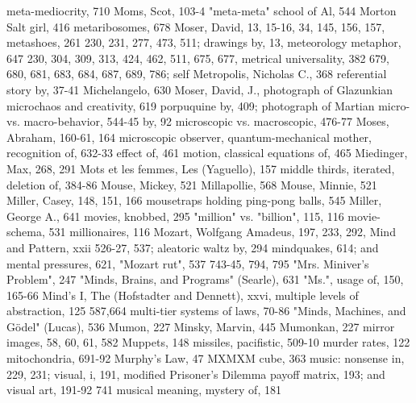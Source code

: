 meta-mediocrity, 710                            Moms, Scot, 103-4
"meta-meta" school of Al, 544                   Morton Salt girl, 416
metaribosomes, 678                              Moser, David, 13, 15-16, 34, 145, 156, 157,
metashoes, 261                                   230, 231, 277, 473, 511; drawings by, 13,
meteorology metaphor, 647                        230, 304, 309, 313, 424, 462, 511, 675, 677,
metrical universality, 382                      679, 680, 681, 683, 684, 687, 689, 786; self
Metropolis, Nicholas C., 368                     referential story by, 37-41
Michelangelo, 630                               Moser, David, J., photograph of Glazunkian
microchaos and creativity, 619                   porpuquine by, 409; photograph of Martian
 micro- vs. macro-behavior, 544-45               by, 92
 microscopic vs. macroscopic, 476-77            Moses, Abraham, 160-61, 164
microscopic observer, quantum-mechanical        mother, recognition of, 632-33
 effect of, 461                                 motion, classical equations of, 465
Miedinger, Max, 268, 291                        Mots et les femmes, Les (Yaguello), 157
middle thirds, iterated, deletion of, 384-86    Mouse, Mickey, 521
Millapollie, 568                                Mouse, Minnie, 521
Miller, Casey, 148, 151, 166                    mousetraps holding ping-pong balls, 545
Miller, George A., 641                          movies, knobbed, 295
"million" vs. "billion", 115, 116               movie-schema, 531
millionaires, 116                               Mozart, Wolfgang Amadeus, 197, 233, 292,
Mind and Pattern, xxii                           526-27, 537; aleatoric waltz by, 294
mindquakes, 614; and mental pressures, 621,     "Mozart rut", 537
 743-45, 794, 795                               "Mrs. Miniver's Problem", 247
"Minds, Brains, and Programs" (Searle), 631     "Ms.", usage of, 150, 165-66
Mind's I, The (Hofstadter and Dennett), xxvi,   multiple levels of abstraction, 125
 587,664                                        multi-tier systems of laws, 70-86
"Minds, Machines, and Gödel" (Lucas), 536       Mumon, 227
Minsky, Marvin, 445                             Mumonkan, 227
mirror images, 58, 60, 61, 582                  Muppets, 148
missiles, pacifistic, 509-10                    murder rates, 122
mitochondria, 691-92                            Murphy's Law, 47
MXMXM cube, 363                                 music: nonsense in, 229, 231; visual, i, 191,
modified Prisoner's Dilemma payoff matrix,       193; and visual art, 191-92
 741                                            musical meaning, mystery of, 181
